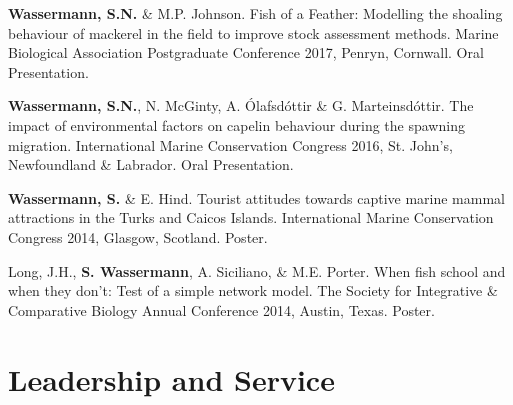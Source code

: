 \documentclass[a4paper]{deedy-resume} %
\begin{document}

\newpage %


\sectionspace


\begin{flushleft}

\sectionspace

\begin{tightitemize}
\item \textbf{Wassermann, S.N.} \& M.P. Johnson. Fish of a Feather: Modelling the shoaling behaviour of mackerel in the field to improve stock assessment methods. Marine Biological Association Postgraduate Conference 2017, Penryn, Cornwall. Oral Presentation.
\item \textbf{Wassermann, S.N.}, N. McGinty, A. \'{O}lafsd\'{o}ttir \& G. Marteinsd\'{o}ttir. The impact of environmental factors on capelin behaviour during the spawning migration. International Marine Conservation Congress 2016, St. John's, Newfoundland \& Labrador. Oral Presentation.
\item \textbf{Wassermann, S.} \& E. Hind. Tourist attitudes towards captive marine mammal attractions in the Turks and Caicos Islands. International Marine Conservation Congress 2014, Glasgow, Scotland. Poster.
\item Long, J.H., \textbf{S. Wassermann}, A. Siciliano, \& M.E. Porter. When fish school and when they don't: Test of a simple network model. The Society for Integrative \& Comparative Biology Annual Conference 2014, Austin, Texas. Poster.
\end{tightitemize}

\sectionspace
\sectionspace


\section{Leadership and Service} 



\end{flushleft}
\end{document}
